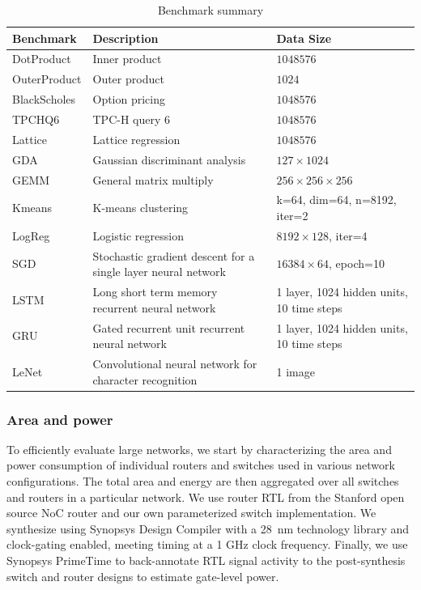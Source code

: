 \begin{table}
\centering
  \footnotesize
  \begin{tabular*}{6.25in}{p{0.75in} p{3in} p{2.5in}}
    \bottomrule
    \textbf{Benchmark} & \textbf{Description} & \textbf{Data Size} \\ \midrule
    DotProduct & Inner product & $1048576$ \\ \midrule
    OuterProduct & Outer product &$1024$ \\ \midrule
    BlackScholes & Option pricing &$1048576$ \\ \midrule
    TPCHQ6 & TPC-H query 6 &$1048576$ \\ \midrule
    Lattice & Lattice regression~\cite{garcia2009lattice} &$1048576$\\ \midrule
    GDA & Gaussian discriminant analysis &$127\times1024$ \\ \midrule
    GEMM & General matrix multiply &$256\times256\times256$ \\ \midrule
    Kmeans & K-means clustering &k=64, dim=64, n=8192, iter=2 \\ \midrule
    LogReg & Logistic regression &$8192\times128$, iter=4\\ \midrule
    SGD & Stochastic gradient descent for a single layer neural network &$16384\times64$, epoch=10 \\ \midrule
    LSTM & Long short term memory recurrent neural network &1 layer, 1024 hidden units, 10 time steps \\ \midrule
    GRU & Gated recurrent unit recurrent neural network &1 layer, 1024 hidden units, 10 time steps \\ \midrule
    LeNet & Convolutional neural network for character recognition& 1 image\\ \midrule
  \end{tabular*}
  \caption{Benchmark summary}
  \label{tab:benchmark}
\end{table}


\subsubsection{Area and power}
To efficiently evaluate large networks, we start by characterizing the area and power consumption of individual routers and switches
used in various network configurations. 
The total area and energy are then aggregated over all switches and routers in a particular network.
We use router RTL from the Stanford open source NoC router \cite{becker2012efficient} and our own parameterized switch implementation.
We synthesize using Synopsys Design Compiler with a \SI{28}{nm} technology library and clock-gating enabled, meeting timing at a 1 GHz clock frequency.
Finally, we use Synopsys PrimeTime to back-annotate RTL signal activity to the post-synthesis switch and router designs to estimate gate-level power.

